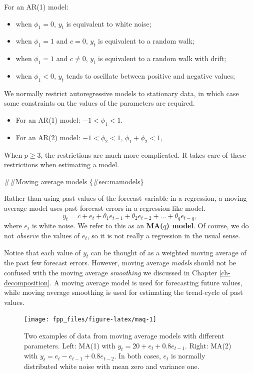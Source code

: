 \documentclass[]{book}
\providecommand{\tightlist}{%
  \setlength{\itemsep}{0pt}\setlength{\parskip}{0pt}}
\begin{document}
For an AR(1) model:

\begin{itemize}
\tightlist
\item
  when \(\phi_1=0\), \(y_t\) is equivalent to white noise;
\item
  when \(\phi_1=1\) and \(c=0\), \(y_t\) is equivalent to a random walk;
\item
  when \(\phi_1=1\) and \(c\ne0\), \(y_t\) is equivalent to a random walk with drift;
\item
  when \(\phi_1<0\), \(y_t\) tends to oscillate between positive and negative values;
\end{itemize}

We normally restrict autoregressive models to stationary data, in which case some constraints on the values of the parameters are required.

\begin{itemize}
\tightlist
\item
  For an AR(1) model: \(-1 < \phi_1 < 1\).
\item
  For an AR(2) model: \(-1 < \phi_2 < 1\), \(\phi_1+\phi_2 < 1\),
\end{itemize}

When \(p\ge3\), the restrictions are much more complicated. R takes care of these restrictions when estimating a model.

\#\#Moving average models \{\#sec:mamodels\}

Rather than using past values of the forecast variable in a regression, a moving average model uses past forecast errors in a regression-like model.
\[
  y_{t} = c + e_t + \theta_{1}e_{t-1} + \theta_{2}e_{t-2} + \dots + \theta_{q}e_{t-q},
\]
where \(e_t\) is white noise. We refer to this as an \textbf{MA(\(q\)) model}. Of course, we do not \emph{observe} the values of \(e_t\), so it is not really a regression in the usual sense.

Notice that each value of \(y_t\) can be thought of as a weighted moving average of the past few forecast errors. However, moving average \emph{models} should not be confused with the moving average \emph{smoothing} we discussed in Chapter \ref{ch-decomposition}. A moving average model is used for forecasting future values, while moving average smoothing is used for estimating the trend-cycle of past values.

\begin{figure}

{\centering \texttt{[image: fpp\_files/figure-latex/maq-1]} 

}

\caption{Two examples of data from moving average models with different parameters. Left: MA(1) with $y_t = 20 + e_t + 0.8e_{t-1}$. Right: MA(2) with $y_t = e_t- e_{t-1}+0.8e_{t-2}$. In both cases, $e_t$ is normally distributed white noise with mean zero and variance one.}\label{fig:maq}
\end{figure}
\end{document}

